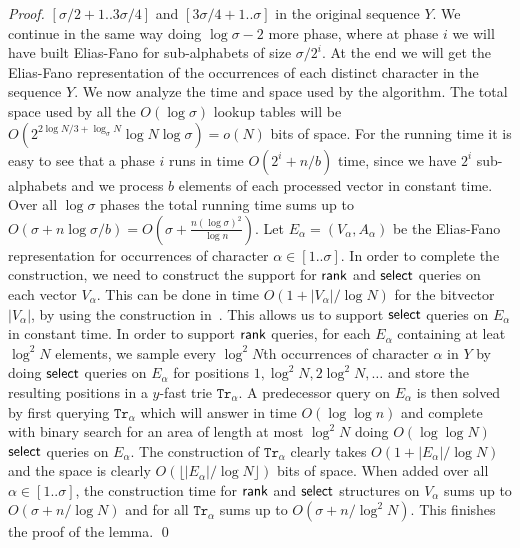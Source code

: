 \documentclass[11pt,runningheads]{llncs}
\def\rank{\mbox{\rm {\sf rank}}}
\def\select{\mbox{\rm {\sf select}}}
\begin{document}
\begin{proof}
$[\sigma/2+1..3\sigma/4]$ and $[3\sigma/4+1..\sigma]$ in the original sequence $Y$. We continue in the same way doing $\log\sigma-2$ more phase, where at phase $i$ we will have built Elias-Fano for sub-alphabets of size $\sigma/2^i$. At the end we will get the Elias-Fano representation of the occurrences of each distinct character in the sequence $Y$. 
We now analyze the time and space used by the algorithm. 
The total space used by all the $O(\log\sigma)$ lookup tables will be $O(2^{2\log N/3+\log_\sigma N}\log N\log\sigma)=o(N)$ bits of space. For the running time it is easy to see that a phase $i$ runs in time $O(2^i+n/b)$ time, since we have $2^i$ sub-alphabets and we process $b$ elements of each processed vector in constant time. Over all $\log\sigma$ phases the total running 
time sums up to $O(\sigma+n\log\sigma/b)=O(\sigma+\frac{n(\log\sigma)^2}{\log n})$. 
Let $E_\alpha=(V_\alpha,A_\alpha)$ be the Elias-Fano representation for occurrences of character $\alpha\in[1..\sigma]$. 
In order to complete the construction, we need to construct the support for $\rank$ and $\select$ 
queries on each vector $V_\alpha$. This can be done in time $O(1+|V_\alpha|/\log N)$ for the bitvector $|V_\alpha|$, by using the construction in~\cite{BGKS15}. This allows us to support $\select$ queries on $E_\alpha$ in constant time. 
In order to support $\rank$ queries, for each $E_\alpha$ containing at leat $\log^2 N$ elements, we sample every $\log^2 N$th occurrences of character $\alpha$ in $Y$ by doing $\select$ queries on $E_\alpha$ for positions $1,\log^2 N,2\log^2 N,\ldots$ and store the resulting positions in a $y$-fast trie $\mathtt{Tr}_\alpha$. A predecessor query on $E_\alpha$ is then solved by first querying $\mathtt{Tr}_\alpha$ which will answer in time $O(\log \log n)$ and complete with binary search for an area of length at most $\log^2 N$ doing $O(\log\log N)$ $\select$ queries on $E_\alpha$. The construction of $\mathtt{Tr}_\alpha$ clearly takes $O(1+|E_\alpha|/\log N)$ and the space is clearly $O(\lfloor|E_\alpha|/\log N \rfloor)$ bits of space. When added over all $\alpha\in[1..\sigma]$, the construction time for $\rank$ and $\select$ structures on $V_\alpha$ sums up to $O(\sigma+n/\log N)$ and for all $\mathtt{Tr}_\alpha$ sums up to $O(\sigma+n/\log^2 N)$. This finishes the proof of the lemma.  
\qed
\end{proof} 
\end{document}
